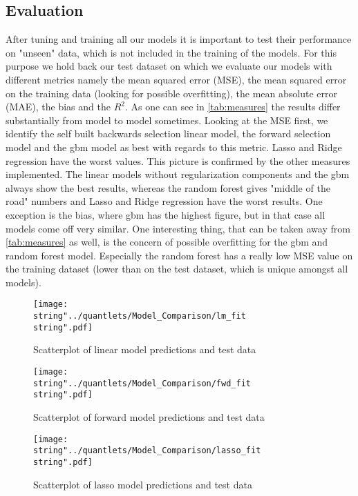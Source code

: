 \subsection{Evaluation}
After tuning and training all our models it is important to test their performance on "unseen" data, which is not included in the training of the models. For this purpose we hold back our test dataset on which we evaluate our models with different metrics namely the mean squared error (MSE), the mean squared error on the training data (looking for possible overfitting), the mean absolute error (MAE), the bias and the $R^2$. As one can see in \ref{tab:measures} the results differ substantially from model to model sometimes. Looking at the MSE first, we identify the self built backwards selection linear model, the forward selection model and the gbm model as best with regards to this metric. Lasso and Ridge regression have the worst values. This picture is confirmed by the other measures implemented. The linear models without regularization components and the gbm always show the best results, whereas the random forest gives "middle of the road" numbers and Lasso and Ridge regression have the worst results. One exception is the bias, where gbm has the highest figure, but in that case all models come off very similar. One interesting thing, that can be taken away from \ref{tab:measures} as well, is the concern of possible overfitting for the gbm and random forest model. Especially the random forest has a really low MSE value on the training dataset (lower than on the test dataset, which is unique amongst all models). 








\begin{figure}[H]
\centering
	\texttt{[image: \\string"../quantlets/Model\_Comparison/lm\_fit\\string".pdf]}
  	\caption{Scatterplot of linear model predictions and test data}
  	\label{fig:lm}
\end{figure}

\begin{figure}[H]
\centering
	\texttt{[image: \\string"../quantlets/Model\_Comparison/fwd\_fit\\string".pdf]}
  	\caption{Scatterplot of forward model predictions and test data}
  	\label{fig:fwd}
\end{figure}

\begin{figure}[H]
\centering
	\texttt{[image: \\string"../quantlets/Model\_Comparison/lasso\_fit\\string".pdf]}
  	\caption{Scatterplot of lasso model predictions and test data}
  	\label{fig:lasso}
\end{figure}


